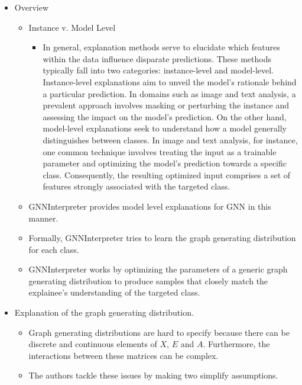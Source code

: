 \documentclass[
  11pt,
  letterpaper,
]{article}
\providecommand{\tightlist}{%
  \setlength{\itemsep}{0pt}\setlength{\parskip}{0pt}}\usepackage{longtable,booktabs,array}
\begin{document}
\begin{itemize}
\item
  Overview

  \begin{itemize}
  \item
    Instance v. Model Level

    \begin{itemize}
    \tightlist
    \item
      In general, explanation methods serve to elucidate which features
      within the data influence disparate predictions. These methods
      typically fall into two categories: instance-level and
      model-level. Instance-level explanations aim to unveil the model's
      rationale behind a particular prediction. In domains such as image
      and text analysis, a prevalent approach involves masking or
      perturbing the instance and assessing the impact on the model's
      prediction. On the other hand, model-level explanations seek to
      understand how a model generally distinguishes between classes. In
      image and text analysis, for instance, one common technique
      involves treating the input as a trainable parameter and
      optimizing the model's prediction towards a specific class.
      Consequently, the resulting optimized input comprises a set of
      features strongly associated with the targeted class.
    \end{itemize}
  \item
    GNNInterpreter provides model level explanations for GNN in this
    manner.
  \item
    Formally, GNNInterpreter tries to learn the graph generating
    distribution for each class.
  \item
    GNNInterpreter works by optimizing the parameters of a generic graph
    generating distribution to produce samples that closely match the
    explainee's understanding of the targeted class.
  \end{itemize}
\item
  Explanation of the graph generating distribution.

  \begin{itemize}
  \item
    Graph generating distributions are hard to specify because there can
    be discrete and continuous elements of \(X\), \(E\) and \(A\).
    Furthermore, the interactions between these matrices can be complex.
  \item
    The authors tackle these issues by making two simplify assumptions.


\end{itemize}
\end{itemize}
\end{document}
